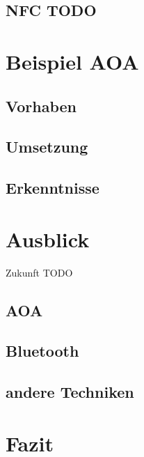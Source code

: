 \documentclass[12pt,journal,compsoc]{IEEEtran}
\begin{document}
\subsection{NFC TODO}




\section{Beispiel AOA}
\subsection{Vorhaben}

\subsection{Umsetzung}

\subsection{Erkenntnisse}


\section{Ausblick}
Zukunft TODO
\subsection{AOA}

\subsection{Bluetooth}
\subsection{andere Techniken}

\section{Fazit}








\end{document}

